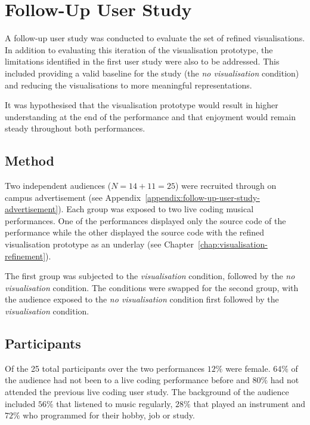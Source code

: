 
\chapter{Follow-Up User Study}
\label{chap:follow-up-user-study}

A follow-up user study was conducted to evaluate the set of refined visualisations. In addition to evaluating this iteration of the visualisation prototype, the limitations identified in the first user study were also to be addressed. This included providing a valid baseline for the study (the \emph{no visualisation} condition) and reducing the visualisations to more meaningful representations.

It was hypothesised that the visualisation prototype would result in higher understanding at the end of the performance and that enjoyment would remain steady throughout both performances.

\section{Method}

Two independent audiences ($N=14+11=25$) were recruited through on campus advertisement (see Appendix~\ref{appendix:follow-up-user-study-advertisement}). Each group was exposed to two live coding musical performances. One of the performances displayed only the source code of the performance while the other displayed the source code with the refined visualisation prototype as an underlay (see Chapter~\ref{chap:visualisation-refinement}).

The first group was subjected to the \emph{visualisation} condition, followed by the \emph{no visualisation} condition. The conditions were swapped for the second group, with the audience exposed to the \emph{no visualisation} condition first followed by the \emph{visualisation} condition.

\section{Participants}

Of the 25 total participants over the two performances $12\%$ were female. $64\%$ of the audience had not been to a live coding performance before and $80\%$ had not attended the previous live coding user study. The background of the audience included $56\%$ that listened to music regularly, $28\%$ that played an instrument and $72\%$ who programmed for their hobby, job or study.

